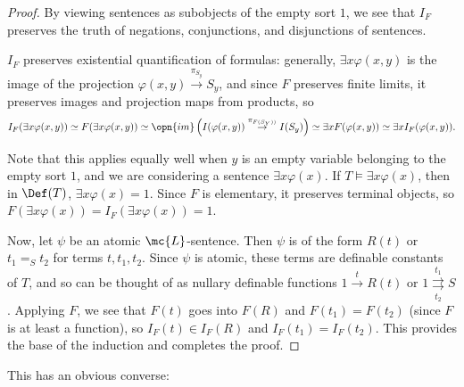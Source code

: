 \documentclass[11pt]{article}
\begin{document}
\begin{proof}
  By viewing sentences as subobjects of the empty sort $1$, we see that $I_F$ preserves the truth of negations, conjunctions, and disjunctions of sentences.

  $I_F$ preserves existential quantification of formulas: generally, $\exists x \varphi(x,y)$ is the image of the projection $\varphi(x,y) \overset{\pi_{S_y}}{\to} S_y$, and since $F$ preserves finite limits, it preserves images and projection maps from products, so $$I_F(\exists x \varphi(x,y)) \simeq F(\exists x \varphi(x,y)) \simeq \opn{im}\left(I(\varphi(x,y)) \overset{\pi_{F(S_Y))}}{\to} I(S_y)\right) \simeq \exists x F(\varphi(x,y)) \simeq \exists x I_F(\varphi(x,y)).$$

  Note that this applies equally well when $y$ is an empty variable belonging to the empty sort $1$, and we are considering a sentence $\exists x \varphi(x)$. If $T \models \exists x \varphi(x)$, then in $\Def(T)$, $\exists x \varphi(x) = 1$. Since $F$ is elementary, it preserves terminal objects, so $F(\exists x \varphi(x)) = I_F(\exists x \varphi(x)) = 1$.

    Now, let $\psi$ be an atomic $\mc{L}$-sentence. Then $\psi$ is of the form $R(t)$ or $t_1 =_S t_2$ for terms $t, t_1, t_2$. Since $\psi$ is atomic, these terms are definable constants of $T$, and so can be thought of as nullary definable functions $1 \overset{t}{\to} R(t)$ or $1 \overset{t_1}{\underset{t_2}{\rightrightarrows}} S$. Applying $F$, we see that $F(t)$ goes into $F(R)$ and $F(t_1) = F(t_2)$ (since $F$ is at least a function), so $I_F(t) \in I_F(R)$ and $I_F(t_1) = I_F(t_2)$. This provides the base of the induction and completes the proof.
  \end{proof}

  This has an obvious converse:
\end{document}
